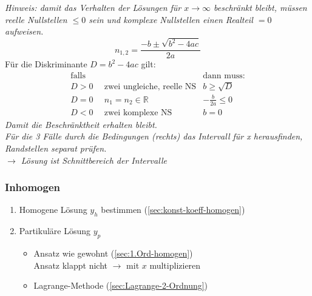         \small{\textit{Hinweis: damit das Verhalten der Lösungen für $x \to \infty$ beschränkt bleibt, müssen reelle Nullstellen $\leq 0$ sein und komplexe Nullstellen einen Realteil $=0$ aufweisen.}
        $$ n_{1,2} = \frac{-b \pm \sqrt{b^2 -4ac}}{2a}$$
        Für die Diskriminante $D = b^2 -4ac$ gilt: 
        \begin{align*}
            \textrm{falls} & & \textrm{dann muss:} \\
            D > 0 & \hspace{6pt} \textrm{zwei ungleiche, reelle NS} & b \geq \sqrt{D} \\
            D = 0 & \hspace{6pt}  n_1 = n_2 \in \mathbb{R} & -\frac{b}{2a} \leq 0 \\
            D < 0 & \hspace{6pt}  \textrm{zwei komplexe NS} & b = 0 
        \end{align*}
        \textit{Damit die Beschränktheit erhalten bleibt. \vspace{2pt}\\
        Für die 3 Fälle durch die Bedingungen (rechts) das Intervall für x herausfinden, Randstellen separat prüfen. \\ 
        $\rightarrow$ Lösung ist Schnittbereich der Intervalle }}
    \subsubsection{Inhomogen}
        \vspace{0.5em}
        \begin{enumerate}
            \item Homogene Lösung $y_h$ bestimmen (\ref{sec:konst-koeff-homogen})
            \item Partikuläre Lösung $y_p$
            \begin{itemize}
                \item Ansatz wie gewohnt (\ref{sec:1.Ord-homogen})\\
                      Ansatz klappt nicht $\to$ mit $x$ multiplizieren
                \item Lagrange-Methode (\ref{sec:Lagrange-2-Ordnung})
            \end{itemize}
        \end{enumerate}